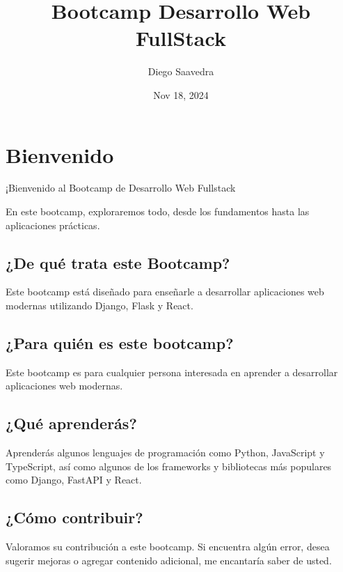 \documentclass[
  a4paper,
  DIV=11,
  numbers=noendperiod,
  onepage,
  openany]{scrreprt}
\title{Bootcamp Desarrollo Web FullStack}
\author{Diego Saavedra}
\date{Nov 18, 2024}
\renewcommand*\contentsname{Table of contents}
\newcommand\contentsname{Table of contents}
\begin{document}
\maketitle

\renewcommand*\contentsname{Table of contents}
{
\hypersetup{linkcolor=}
\setcounter{tocdepth}{2}
\tableofcontents
}

\chapter{Bienvenido}\label{bienvenido}

¡Bienvenido al Bootcamp de Desarrollo Web Fullstack

En este bootcamp, exploraremos todo, desde los fundamentos hasta las
aplicaciones prácticas.

\section{¿De qué trata este
Bootcamp?}\label{de-quuxe9-trata-este-bootcamp}

Este bootcamp está diseñado para enseñarle a desarrollar aplicaciones
web modernas utilizando Django, Flask y React.

\section{¿Para quién es este
bootcamp?}\label{para-quiuxe9n-es-este-bootcamp}

Este bootcamp es para cualquier persona interesada en aprender a
desarrollar aplicaciones web modernas.

\section{¿Qué aprenderás?}\label{quuxe9-aprenderuxe1s}

Aprenderás algunos lenguajes de programación como Python, JavaScript y
TypeScript, así como algunos de los frameworks y bibliotecas más
populares como Django, FastAPI y React.

\section{¿Cómo contribuir?}\label{cuxf3mo-contribuir}

Valoramos su contribución a este bootcamp. Si encuentra algún error,
desea sugerir mejoras o agregar contenido adicional, me encantaría saber
de usted.
\end{document}
